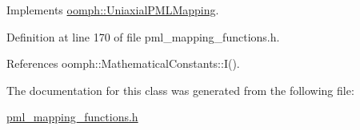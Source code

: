 Implements \hyperlink{classoomph_1_1UniaxialPMLMapping_ae4a0c65e90fe4b90d2ff00b193798588}{oomph\+::\+Uniaxial\+P\+M\+L\+Mapping}.



Definition at line 170 of file pml\+\_\+mapping\+\_\+functions.\+h.



References oomph\+::\+Mathematical\+Constants\+::\+I().



The documentation for this class was generated from the following file\+:\begin{DoxyCompactItemize}
\item 
\hyperlink{pml__mapping__functions_8h}{pml\+\_\+mapping\+\_\+functions.\+h}\end{DoxyCompactItemize}
